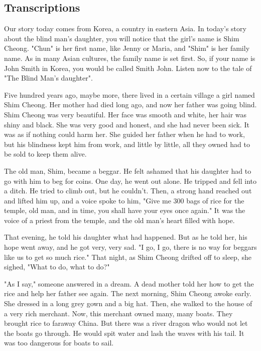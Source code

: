 \subsection{Transcriptions}

Our story today comes from Korea, a country in eastern Asia. In today's story about the blind man's daughter, you will notice that the girl's name is Shim Cheong. "Chun" is her first name, like Jenny or Maria, and "Shim" is her family name. As in many Asian cultures, the family name is set first. So, if your name is John Smith in Korea, you would be called Smith John. Listen now to the tale of "The Blind Man's daughter".

Five hundred years ago, maybe more, there lived in a certain village a girl named Shim Cheong. Her mother had died long ago, and now her father was going blind. Shim Cheong was very beautiful. Her face was smooth and white, her hair was shiny and black. She was very good and honest, and she had never been sick. It was as if nothing could harm her. She guided her father when he had to work, but his blindness kept him from work, and little by little, all they owned had to be sold to keep them alive.

The old man, Shim, became a beggar. He felt ashamed that his daughter had to go with him to beg for coins. One day, he went out alone. He tripped and fell into a ditch. He tried to climb out, but he couldn't. Then, a strong hand reached out and lifted him up, and a voice spoke to him, "Give me 300 bags of rice for the temple, old man, and in time, you shall have your eyes once again." It was the voice of a priest from the temple, and the old man's heart filled with hope.

That evening, he told his daughter what had happened. But as he told her, his hope went away, and he got very, very sad. "I go, I go, there is no way for beggars like us to get so much rice." That night, as Shim Cheong drifted off to sleep, she sighed, "What to do, what to do?"

"As I say," someone answered in a dream. A dead mother told her how to get the rice and help her father see again. The next morning, Shim Cheong awoke early. She dressed in a long grey gown and a big hat. Then, she walked to the house of a very rich merchant. Now, this merchant owned many, many boats. They brought rice to faraway China. But there was a river dragon who would not let the boats go through. He would spit water and lash the waves with his tail. It was too dangerous for boats to sail.

